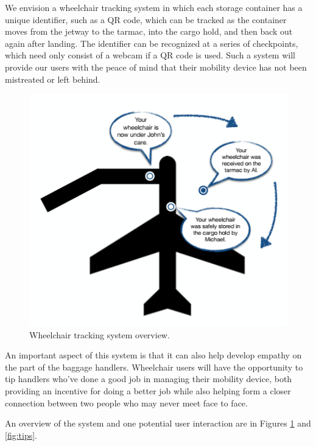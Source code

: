 We envision a wheelchair tracking system in which each storage container has a unique identifier, such as a QR code, which can be tracked as the container moves from the jetway to the tarmac, into the cargo hold, and then back out again after landing. The identifier can be recognized at a series of checkpoints, which need only consist of a webcam if a QR code is used. Such a system will provide our users with the peace of mind that their mobility device has not been mistreated or left behind.

\begin{figure}[h!]
  \centering
     \includegraphics[width=12cm]{images/tracking.png}
   \caption{Wheelchair tracking system overview.}
  \label{fig:tracking}
\end{figure}


An important aspect of this system is that it can also help develop empathy on the part of the baggage handlers. Wheelchair users will have the opportunity to tip handlers who've done a good job in managing their mobility device, both providing an incentive for doing a better job while also helping form a closer connection between two people who may never meet face to face.

An overview of the system and one potential user interaction are in Figures \ref{fig:tracking} and \ref{fig:tips}.


